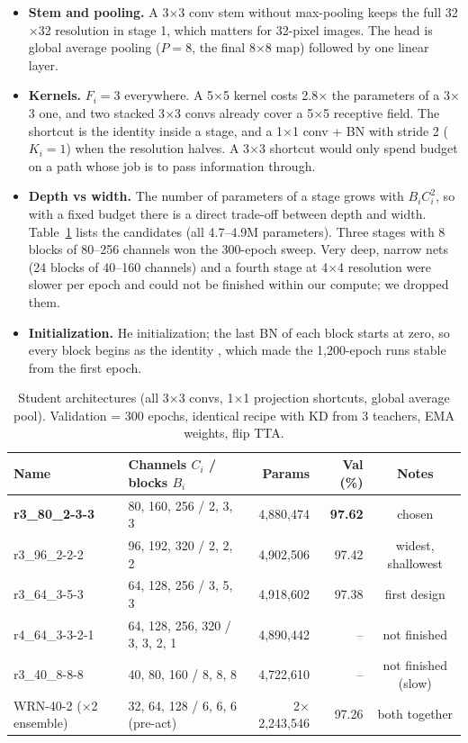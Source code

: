 \documentclass[10pt]{article}
\begin{document}
\begin{itemize}
\item \textbf{Stem and pooling.} A 3$\times$3 conv stem without max-pooling keeps the full 32$\times$32 resolution in
  stage 1, which matters for 32-pixel images. The head is global average pooling ($P{=}8$, the final 8$\times$8
  map) followed by one linear layer.
\item \textbf{Kernels.} $F_i{=}3$ everywhere. A 5$\times$5 kernel costs 2.8$\times$ the parameters of a 3$\times$3 one,
  and two stacked 3$\times$3 convs already cover a 5$\times$5 receptive field. The shortcut is the identity inside a stage,
  and a 1$\times$1 conv + BN with stride 2 ($K_i{=}1$) when the resolution halves. A 3$\times$3 shortcut would only spend budget
  on a path whose job is to pass information through.
\item \textbf{Depth vs width.} The number of parameters of a stage grows with $B_i C_i^2$, so with a fixed budget there is a direct trade-off
  between depth and width. Table~\ref{tab:arch} lists the candidates (all 4.7--4.9M parameters).
  Three stages with 8 blocks of 80--256 channels won the 300-epoch sweep. Very deep, narrow nets (24 blocks of
  40--160 channels) and a fourth stage at 4$\times$4 resolution were slower per epoch and could not be
  finished within our compute; we dropped them.
\item \textbf{Initialization.} He initialization; the last BN of each block starts at zero, so every block begins as
  the identity \cite{goyal2017}, which made the 1,200-epoch runs stable from the first epoch.
\end{itemize}

\begin{table}[t]
\centering\small
\caption{Student architectures (all 3$\times$3 convs, 1$\times$1 projection shortcuts, global average pool).
Validation = 300 epochs, identical recipe with KD from 3 teachers, EMA weights, flip TTA.}
\label{tab:arch}
\begin{tabular}{llrrc}
\toprule
Name & Channels $C_i$ / blocks $B_i$ & Params & Val (\%) & Notes\\
\midrule
\textbf{r3\_80\_2-3-3} & 80, 160, 256 / 2, 3, 3 & 4,880,474 & \textbf{97.62} & chosen\\
r3\_96\_2-2-2 & 96, 192, 320 / 2, 2, 2 & 4,902,506 & 97.42 & widest, shallowest\\
r3\_64\_3-5-3 & 64, 128, 256 / 3, 5, 3 & 4,918,602 & 97.38 & first design\\
r4\_64\_3-3-2-1 & 64, 128, 256, 320 / 3, 3, 2, 1 & 4,890,442 & -- & not finished\\
r3\_40\_8-8-8 & 40, 80, 160 / 8, 8, 8 & 4,722,610 & -- & not finished (slow)\\
\midrule
WRN-40-2 ($\times$2 ensemble) & 32, 64, 128 / 6, 6, 6 (pre-act) & 2$\times$2,243,546 & 97.26 & both together\\
\bottomrule
\end{tabular}
\end{table}
\end{document}

